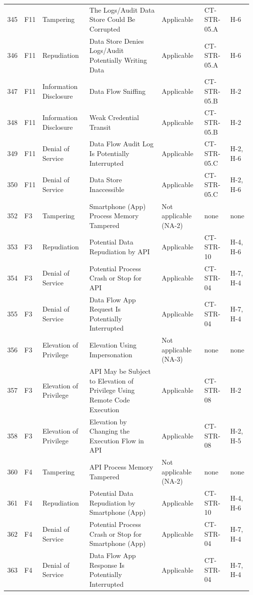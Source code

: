 \begin{footnotesize}
\begin{longtable}{l l p{} p{} p{} l p{}}
        345 & F11 & Tampering & The Logs/Audit Data Store Could Be Corrupted & Applicable & CT-STR-05.A & H-6 \\
        346 & F11 & Repudiation & Data Store Denies Logs/Audit Potentially Writing Data & Applicable & CT-STR-05.A & H-6 \\
        347 & F11 & Information Disclosure & Data Flow Sniffing & Applicable & CT-STR-05.B & H-2 \\
        348 & F11 & Information Disclosure & Weak Credential Transit & Applicable & CT-STR-05.B & H-2 \\
        349 & F11 & Denial of Service & Data Flow Audit Log Is Potentially Interrupted & Applicable & CT-STR-05.C & H-2, H-6 \\
        350 & F11 & Denial of Service & Data Store Inaccessible & Applicable & CT-STR-05.C & H-2, H-6 \\
        352 & F3 & Tampering & Smartphone (App) Process Memory Tampered & Not applicable (NA-2) & none & none \\
        353 & F3 & Repudiation & Potential Data Repudiation by API & Applicable & CT-STR-10 & H-4, H-6 \\
        354 & F3 & Denial of Service & Potential Process Crash or Stop for API & Applicable & CT-STR-04 & H-7, H-4 \\
        355 & F3 & Denial of Service & Data Flow App Request Is Potentially Interrupted & Applicable & CT-STR-04 & H-7, H-4 \\
        356 & F3 & Elevation of Privilege & Elevation Using Impersonation & Not applicable (NA-3) & none & none \\
        357 & F3 & Elevation of Privilege & API May be Subject to Elevation of Privilege Using Remote Code Execution & Applicable & CT-STR-08 & H-2 \\
        358 & F3 & Elevation of Privilege & Elevation by Changing the Execution Flow in API & Applicable & CT-STR-08 & H-2, H-5 \\
        360 & F4 & Tampering & API Process Memory Tampered & Not applicable (NA-2) & none & none \\
        361 & F4 & Repudiation & Potential Data Repudiation by Smartphone (App) & Applicable & CT-STR-10 & H-4, H-6 \\
        362 & F4 & Denial of Service & Potential Process Crash or Stop for Smartphone (App) & Applicable & CT-STR-04 & H-7, H-4 \\
        363 & F4 & Denial of Service & Data Flow App Response Is Potentially Interrupted & Applicable & CT-STR-04 & H-7, H-4 \\

\end{longtable}
\end{footnotesize}
